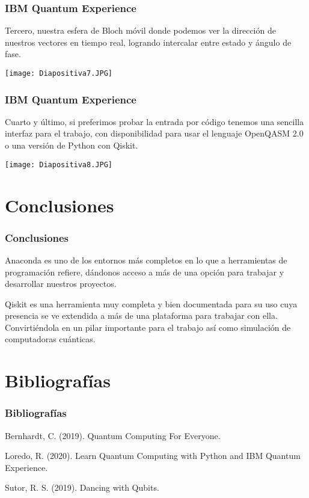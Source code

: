 \documentclass[spanish]{beamer}
\begin{document}
  \newpage\justify \begin{frame}
 \frametitle{IBM Quantum Experience} 
 Tercero, nuestra esfera de Bloch móvil donde podemos ver la dirección de nuestros vectores en tiempo real, logrando intercalar entre estado y ángulo de fase.
 
 \centering\texttt{[image: Diapositiva7.JPG]}
 \end{frame}
 
 \newpage\justify \begin{frame}
 \frametitle{IBM Quantum Experience} 
Cuarto y último, si preferimos probar la entrada por código tenemos una sencilla interfaz para el trabajo, con disponibilidad para usar el lenguaje OpenQASM 2.0 o una versión de Python con Qiskit.
 
\centering\texttt{[image: Diapositiva8.JPG]}
\end{frame}
\section{Conclusiones}\setlength{\parskip}{1mm}
\begin{frame}[fragile]\frametitle{Conclusiones}\justify 

Anaconda es uno de los entornos más completos en lo que a herramientas de programación refiere, dándonos acceso a más de una opción para trabajar y desarrollar nuestros proyectos. 

Qiskit es una herramienta muy completa y bien documentada para su uso cuya presencia se ve extendida a más de una plataforma para trabajar con ella. Convirtiéndola en un pilar importante para el trabajo así como simulación de computadoras cuánticas.

\end{frame}
\section{Bibliografías}\setlength{\parskip}{1mm}
\begin{frame}[fragile]\frametitle{Bibliografías}\justify 
Bernhardt, C. (2019). Quantum Computing For Everyone. 

Loredo, R. (2020). Learn Quantum Computing with Python and IBM Quantum Experience. 

Sutor, R. S. (2019). Dancing with Qubits. 

\end{frame}
\end{document}
